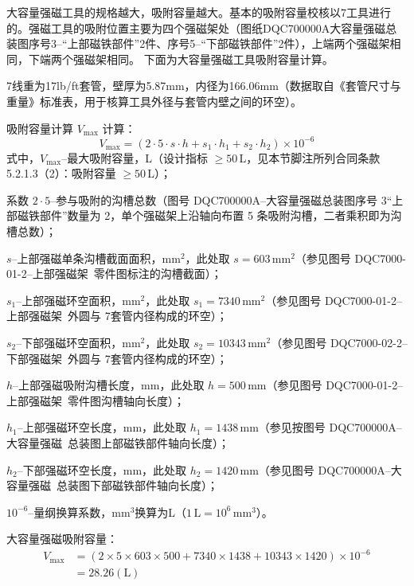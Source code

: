 大容量强磁工具的规格越大，吸附容量越大。基本的吸附容量校核以7\inch 工具进行的。强磁工具的吸附位置主要为四个强磁架处（图纸DQC700000A大容量强磁总装图序号3--“上部磁铁部件”2件、序号5--“下部磁铁部件”2件），上端两个强磁架相同，下端两个强磁架相同。
下面为大容量强磁工具吸附容量计算。

7\inch 线重为17lb/ft套管，壁厚为5.87mm，内径为166.06mm（数据取自《套管尺寸与重量》标准表，用于核算工具外径与套管内壁之间的环空）。

吸附容量计算 $V_{\max}$ 计算：
\begin{equation}
    V_{\max} = (2 \cdot 5 \cdot s \cdot h + s_1 \cdot h_1 + s_2 \cdot h_2) \times 10^{-6}
    \label{eq:mag_tool_adsorption_capacity}
\end{equation}
式中，$V_{\max}$--最大吸附容量，L（设计指标 $\ge 50$\,L，见本节脚注所列合同条款 5.2.1.3（2）：吸附容量 $\ge 50$\,L）；

系数 $2\cdot 5$--参与吸附的沟槽总数（图号 DQC700000A--大容量强磁总装图序号 3“上部磁铁部件”数量为 2，单个强磁架上沿轴向布置 5 条吸附沟槽，二者乘积即为沟槽总数）；

$s$--上部强磁单条沟槽截面面积，$\text{mm}^2$，此处取 $s = 603\,\text{mm}^2$（参见图号 DQC7000-01-2--上部强磁架\ 零件图标注的沟槽截面）；

$s_1$--上部强磁环空面积，$\text{mm}^2$，此处取 $s_1 = 7340\,\text{mm}^2$（参见图号 DQC7000-01-2--上部强磁架\ 外圆与 7\inch 套管内径构成的环空）；

$s_2$--下部强磁环空面积，$\text{mm}^2$，此处取 $s_2 = 10343\,\text{mm}^2$（参见图号 DQC7000-02-2--下部强磁架\ 外圆与 7\inch 套管内径构成的环空）；

$h$--上部强磁吸附沟槽长度，mm，此处取 $h = 500\,\text{mm}$（参见图号 DQC7000-01-2--上部强磁架\ 零件图沟槽轴向长度）；

$h_1$--上部强磁环空长度，mm，此处取 $h_1 = 1438\,\text{mm}$（参见按图号 DQC700000A--大容量强磁\ 总装图上部磁铁部件轴向长度）；

$h_2$--下部强磁环空长度，mm，此处取 $h_2 = 1420\,\text{mm}$（参见图号 DQC700000A--大容量强磁\ 总装图下部磁铁部件轴向长度）；

$10^{-6}$--量纲换算系数，mm$^3$换算为L（$1\,\text{L} = 10^6\,\text{mm}^3$）。

大容量强磁吸附容量：
\begin{equation}
	\begin{aligned}
    V_{\max} &= (2 \times 5 \times 603 \times 500 + 7340 \times 1438 + 10343 \times 1420) \times 10^{-6} \\
             &= 28.26(\text{L})
	\end{aligned}
\end{equation}

